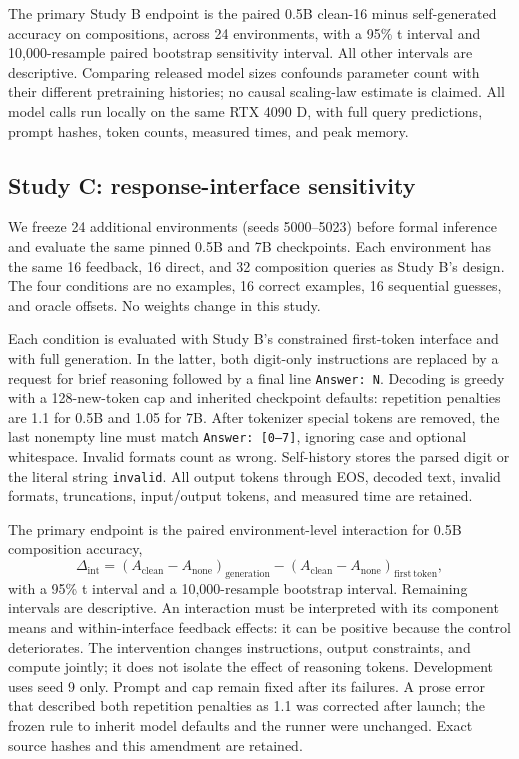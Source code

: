 \documentclass[11pt]{article}
\begin{document}
The primary Study B endpoint is the paired 0.5B clean-16 minus self-generated
accuracy on compositions, across 24 environments, with a 95\% t interval and
10,000-resample paired bootstrap sensitivity interval. All other intervals
are descriptive. Comparing released model sizes confounds parameter count
with their different pretraining histories; no causal scaling-law estimate is
claimed. All model calls run locally on the same RTX 4090 D, with full query
predictions, prompt hashes, token counts, measured times, and peak memory.

\subsection{Study C: response-interface sensitivity}
We freeze 24 additional environments (seeds 5000--5023) before formal inference
and evaluate the same pinned 0.5B and 7B checkpoints. Each environment has the
same 16 feedback, 16 direct, and 32 composition queries as Study B's design.
The four conditions are no examples, 16 correct examples, 16 sequential guesses,
and oracle offsets. No weights change in this study.

Each condition is evaluated with Study B's constrained first-token interface
and with full generation. In the latter, both digit-only instructions are
replaced by a request for brief reasoning followed by a final line
\texttt{Answer: N}. Decoding is greedy with a 128-new-token cap and inherited
checkpoint defaults: repetition penalties are 1.1 for 0.5B and 1.05 for 7B.
After tokenizer special tokens are removed, the last nonempty line must match
\texttt{Answer: [0--7]}, ignoring case and optional whitespace. Invalid formats
count as wrong. Self-history stores the parsed digit or the literal string
\texttt{invalid}. All output tokens through EOS, decoded text, invalid formats,
truncations, input/output tokens, and measured time are retained.

The primary endpoint is the paired environment-level interaction for 0.5B
composition accuracy,
\[
 \Delta_{\mathrm{int}}=
 (A_{\mathrm{clean}}-A_{\mathrm{none}})_{\mathrm{generation}}
 -(A_{\mathrm{clean}}-A_{\mathrm{none}})_{\mathrm{first\ token}},
\]
with a 95\% t interval and a 10,000-resample bootstrap interval. Remaining
intervals are descriptive. An interaction must be interpreted with its component
means and within-interface feedback effects: it can be positive because the
control deteriorates. The intervention changes instructions, output constraints,
and compute jointly; it does not isolate the effect of reasoning tokens.
Development uses seed 9 only. Prompt and cap remain fixed after its failures.
A prose error that described both repetition penalties as 1.1 was corrected
after launch; the frozen rule to inherit model defaults and the runner were
unchanged. Exact source hashes and this amendment are retained.
\end{document}
